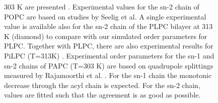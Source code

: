 \documentclass[aps,prl,superscriptaddress,twocolumn]{revtex4}
\begin{document}
\begin{figure}[]
{   303 K are presented \cite{huber02}. Experimental values for the sn-2 chain of POPC
   are based on studies by Seelig et al. \cite{seelig78} A single experimental value is
   available also for the sn-2 chain of the PLPC bilayer at 313 K
   (diamond) \cite{baenziger91} to compare with our simulated order parameters for PLPC.
   Together with PLPC, there are also experimental results for PiLPC (T=313K) \cite{baenziger91}. 
   Experimental order parameters for the sn-1 and sn-2 chains
   of PAPC (T=303 K) are based on quadrupole splittings measured by
   Rajamoorthi et al. \cite{rajamoorthi91}. For the sn-1 chain the monotonic decrease through
   the acyl chain is expected. For the sn-2 chain, values are fitted such
   that the agreement is as good as possible.
  } 
\end{figure}
\end{document}
